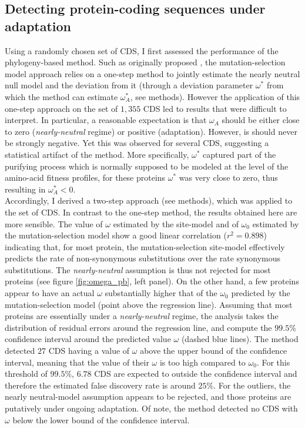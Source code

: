 \documentclass{article}
\begin{document}
	\subsection*{Detecting protein-coding sequences under adaptation}
	Using a randomly chosen set of CDS, I first assessed the performance of the phylogeny-based method. Such as originally proposed \cite{Rodrigue2016}, the mutation-selection model approach relies on a one-step method to jointly estimate the nearly neutral null model and the deviation from it (through a deviation parameter $\omega^*$ from which the method can estimate $\omega_A^*$, see methods). However the application of this one-step approach on the set of $1,355$ CDS led to results that were difficult to interpret. In particular, a reasonable expectation is that $\omega_A$ should be either close to zero (\textit{nearly-neutral} regime) or positive (adaptation). However, is should never be strongly negative. Yet this was observed for several CDS, suggesting a statistical artifact of the method. More specifically, $\omega^*$ captured part of the purifying process which is normally supposed to be modeled at the level of the amino-acid fitness profiles, for these proteins $\omega^*$ was very close to zero, thus resulting in $\omega_A^*<0$.  \\
	
	Accordingly, I derived a two-step approach (see methods), which was applied to the set of CDS. In contrast to the one-step method, the results obtained here are more sensible. The value of $\omega$ estimated by the site-model and of $\omega_{0}$ estimated by the mutation-selection model show a good linear correlation ($r^2=0.898$) indicating that, for most protein, the mutation-selection site-model effectively predicts the rate of non-synonymous substitutions over the rate synonymous substitutions. The \textit{nearly-neutral} assumption is thus not rejected for most proteins (see figure \ref{fig:omega_pb}, left panel).
	On the other hand, a few proteins appear to have an actual $\omega$ substantially higher that of the $\omega_0$ predicted by the mutation-selection model (point above the regression line). Assuming that most proteins are essentially under a \textit{nearly-neutral} regime, the analysis takes the distribution of residual errors around the regression line, and compute the $99.5\%$ confidence interval around the predicted value $\omega$ (dashed blue lines).  The method detected $27$ CDS having a value of $\omega$ above the upper bound of the confidence interval, meaning that the value of their $\omega$ is too high compared to $\omega_{0}$. For this threshold of $99.5\%$, $6.78$ CDS are expected to outside the confidence interval and therefore the estimated false discovery rate is around $25 \%$. For the outliers, the nearly neutral-model assumption appears to be rejected, and those proteins are putatively under ongoing adaptation. Of note, the method detected no CDS with $\omega$ below the lower bound of the confidence interval. \\
	
\end{document}
